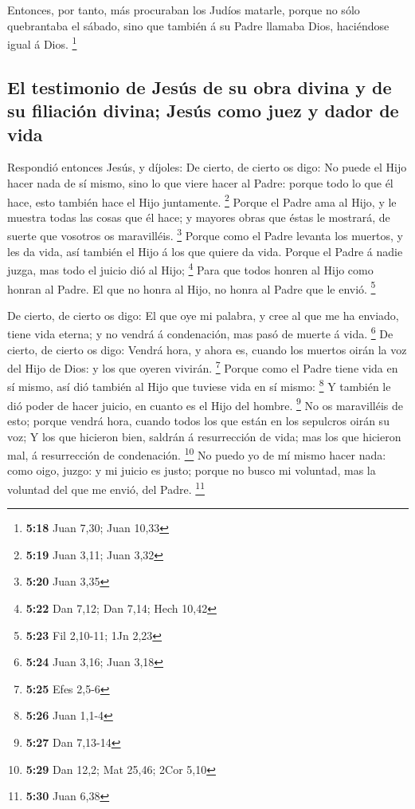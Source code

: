  Entonces, por tanto, más procuraban los Judíos matarle,
porque no sólo quebrantaba el sábado, sino que también á su Padre
llamaba Dios, haciéndose igual á Dios. \footnote{\textbf{5:18} Juan
  7,30; Juan 10,33}

\hypertarget{el-testimonio-de-jesuxfas-de-su-obra-divina-y-de-su-filiaciuxf3n-divina-jesuxfas-como-juez-y-dador-de-vida}{%
\subsection{El testimonio de Jesús de su obra divina y de su filiación
divina; Jesús como juez y dador de
vida}\label{el-testimonio-de-jesuxfas-de-su-obra-divina-y-de-su-filiaciuxf3n-divina-jesuxfas-como-juez-y-dador-de-vida}}

 Respondió entonces Jesús, y díjoles: De cierto, de cierto
os digo: No puede el Hijo hacer nada de sí mismo, sino lo que viere
hacer al Padre: porque todo lo que él hace, esto también hace el Hijo
juntamente. \footnote{\textbf{5:19} Juan 3,11; Juan 3,32} 
Porque el Padre ama al Hijo, y le muestra todas las cosas que él hace; y
mayores obras que éstas le mostrará, de suerte que vosotros os
maravilléis. \footnote{\textbf{5:20} Juan 3,35}  Porque
como el Padre levanta los muertos, y les da vida, así también el Hijo á
los que quiere da vida.  Porque el Padre á nadie juzga, mas
todo el juicio dió al Hijo; \footnote{\textbf{5:22} Dan 7,12; Dan 7,14;
  Hech 10,42}  Para que todos honren al Hijo como honran al
Padre. El que no honra al Hijo, no honra al Padre que le envió.
\footnote{\textbf{5:23} Fil 2,10-11; 1Jn 2,23}

 De cierto, de cierto os digo: El que oye mi palabra, y
cree al que me ha enviado, tiene vida eterna; y no vendrá á condenación,
mas pasó de muerte á vida. \footnote{\textbf{5:24} Juan 3,16; Juan 3,18}
 De cierto, de cierto os digo: Vendrá hora, y ahora es,
cuando los muertos oirán la voz del Hijo de Dios: y los que oyeren
vivirán. \footnote{\textbf{5:25} Efes 2,5-6}  Porque como
el Padre tiene vida en sí mismo, así dió también al Hijo que tuviese
vida en sí mismo: \footnote{\textbf{5:26} Juan 1,1-4}  Y
también le dió poder de hacer juicio, en cuanto es el Hijo del hombre.
\footnote{\textbf{5:27} Dan 7,13-14}  No os maravilléis de
esto; porque vendrá hora, cuando todos los que están en los sepulcros
oirán su voz;  Y los que hicieron bien, saldrán á
resurrección de vida; mas los que hicieron mal, á resurrección de
condenación. \footnote{\textbf{5:29} Dan 12,2; Mat 25,46; 2Cor 5,10}
 No puedo yo de mí mismo hacer nada: como oigo, juzgo: y mi
juicio es justo; porque no busco mi voluntad, mas la voluntad del que me
envió, del Padre. \footnote{\textbf{5:30} Juan 6,38}

